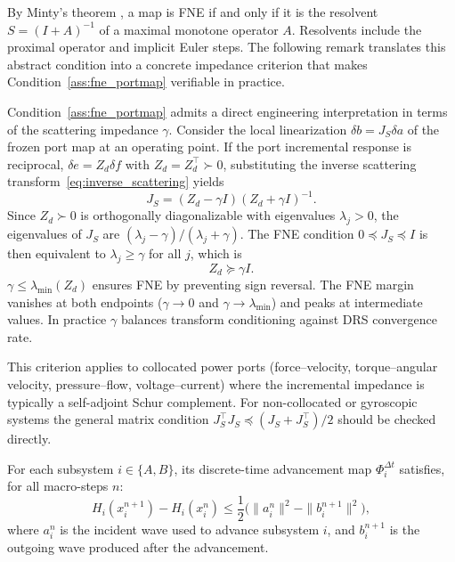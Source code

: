 By Minty's theorem \cite{bauschke2017convex}, a map is FNE if and only if it is the resolvent $S = (I + A)^{-1}$ of a maximal monotone operator $A$. Resolvents include the proximal operator and implicit Euler steps. The following remark translates this abstract condition into a concrete impedance criterion that makes Condition~\ref{ass:fne_portmap} verifiable in practice.

\begin{remark}
\label{rem:gamma_rule}
Condition~\ref{ass:fne_portmap} admits a direct engineering interpretation in terms of the scattering impedance $\gamma$. Consider the local linearization $\delta b = J_S \delta a$ of the frozen port map at an operating point. If the port incremental response is reciprocal, $\delta e = Z_d \delta f$ with $Z_d = Z_d^\top \succ 0$, substituting the inverse scattering transform~\eqref{eq:inverse_scattering} yields
\begin{equation}
J_S = (Z_d - \gamma I)(Z_d + \gamma I)^{-1}.
\label{eq:js_expression}
\end{equation}
Since $Z_d \succ 0$ is orthogonally diagonalizable with eigenvalues $\lambda_j > 0$, the eigenvalues of $J_S$ are $(\lambda_j - \gamma)/(\lambda_j + \gamma)$. The FNE condition $0 \preceq J_S \preceq I$ is then equivalent to $\lambda_j \geq \gamma$ for all $j$, which is
\begin{equation}
Z_d \succeq \gamma I.
\label{eq:impedance_condition}
\end{equation}
$\gamma \leq \lambda_{\min}(Z_d)$ ensures FNE by preventing sign reversal. The FNE margin vanishes at both endpoints ($\gamma \to 0$ and $\gamma \to \lambda_{\min}$) and peaks at intermediate values. In practice $\gamma$ balances transform conditioning against DRS convergence rate.

This criterion applies to collocated power ports (force--velocity, torque--angular velocity, pressure--flow, voltage--current) where the incremental impedance is typically a self-adjoint Schur complement. For non-collocated or gyroscopic systems the general matrix condition $J_S^\top J_S \preceq (J_S + J_S^\top)/2$ should be checked directly.
\end{remark}

\begin{condition}
\label{ass:discrete_passivity}
For each subsystem $i \in \{A, B\}$, its discrete-time advancement map $\Phi_i^{\Delta t}$ satisfies, for all macro-steps $n$:
\begin{equation}
H_i(x_i^{n+1}) - H_i(x_i^n) \leq \frac{1}{2}\big(\|a_i^n\|^2 - \|b_i^{n+1}\|^2\big),
\label{eq:discrete_passivity_scattering}
\end{equation}
where $a_i^n$ is the incident wave used to advance subsystem $i$, and $b_i^{n+1}$ is the outgoing wave produced after the advancement.
\end{condition}


